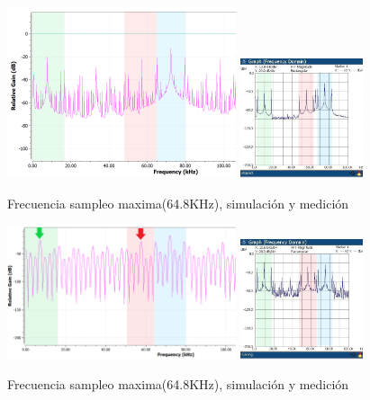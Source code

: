 \documentclass[../../ASSD_TP1_G7.tex]{subfiles}
\begin{document}
\begin{figure}[H]
\centering
{}
{\includegraphics[width=0.6\textwidth]{figures/simpto_8_llave_64,8khz_espectro.png}}
{\includegraphics[width=0.32\textwidth]{figures/lla_fmax.jpeg}}
\caption{Frecuencia sampleo maxima(64.8KHz), simulación y medición}
\label{fig:subnyq_lla_fmax}
\end{figure}

\begin{figure}[H]
\centering
{}
{\includegraphics[width=0.6\textwidth]{figures/simpto_8_syh_64,8_espectro.png}}
{\includegraphics[width=0.32\textwidth]{figures/syh_fmax.jpeg}}
\caption{Frecuencia sampleo maxima(64.8KHz), simulación y medición}
\label{fig:subnyq_syh_fmax}
\end{figure}
\end{document}
